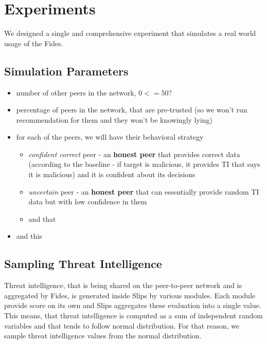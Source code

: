 \chapter{Experiments}
\label{chap:experiments}

We designed a single and comprehensive experiment that simulates a real world usage of the Fides. 


\section{Simulation Parameters}

\begin{itemize}
    \item number of other peers in the network, $0 <= 50?$
    \item percentage of peers in the network, that are pre-trusted (so we won't run recommendation for them and they won't be knowingly lying)
    \item for each of the peers, we will have their behavioral strategy 
    \begin{itemize}
        \item \textit{confident correct} peer - an \textbf{honest peer} that provides correct data (according to the baseline - if target is malicious, it provides TI that says it is malicious) and it is confident about its decisions
        \item \textit{uncertain} peer - an \textbf{honest peer} that can essentially provide random TI data but with low confidence in them
        \item and that
    \end{itemize}
    \item and this
\end{itemize}

\section{Sampling Threat Intelligence}
Threat intelligence, that is being shared on the peer-to-peer network and is aggregated by Fides, is generated inside Slips by various modules.
Each module provide score on its own and Slips aggregates these evaluation into a single value. 
This means, that threat intelligence is computed as a sum of independent random variables and that tends to follow normal distribution. 
For that reason, we sample threat intelligence values from the normal distribution.

